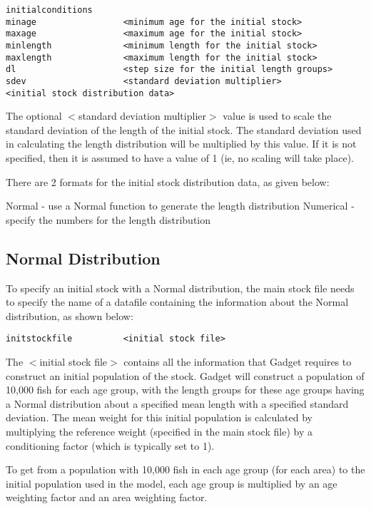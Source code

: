\documentclass [a4paper, 10pt]{book}
\begin{document}
{\small\begin{verbatim}
initialconditions
minage                 <minimum age for the initial stock>
maxage                 <maximum age for the initial stock>
minlength              <minimum length for the initial stock>
maxlength              <maximum length for the initial stock>
dl                     <step size for the initial length groups>
sdev                   <standard deviation multiplier>
<initial stock distribution data>
\end{verbatim}}

The optional $<$standard deviation multiplier$>$ value is used to scale the standard deviation of the length of the initial stock.  The standard deviation used in calculating the length distribution will be multiplied by this value.  If it is not specified, then it is assumed to have a value of 1 (ie, no scaling will take place).

\bigskip
There are 2 formats for the initial stock distribution data, as given below:

\bigskip
Normal - use a Normal function to generate the length distribution\newline
Numerical - specify the numbers for the length distribution

\subsection{Normal Distribution}
To specify an initial stock with a Normal distribution, the main stock file needs to specify the name of a datafile containing the information about the Normal distribution, as shown below:

{\small\begin{verbatim}
initstockfile          <initial stock file>
\end{verbatim}}

The $<$initial stock file$>$ contains all the information that Gadget requires to construct an initial population of the stock.  Gadget will construct a population of 10,000 fish for each age group, with the length groups for these age groups having a Normal distribution about a specified mean length with a specified standard deviation.  The mean weight for this initial population is calculated by multiplying the reference weight (specified in the main stock file) by a conditioning factor (which is typically set to 1).

\bigskip
To get from a population with 10,000 fish in each age group (for each area) to the initial population used in the model, each age group is multiplied by an age weighting factor and an area weighting factor.
\end{document}
